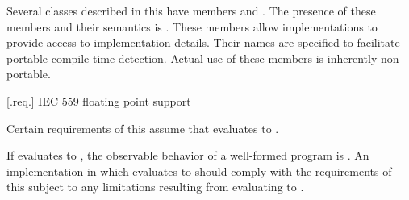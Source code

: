 \pnum
Several classes described in this \documenttypename{} have members 
 and . The presence of these 
members and their semantics is .
\enternote
These members allow implementations to provide access to implementation 
details. Their names are specified to facilitate portable compile-time 
detection. Actual use of these members is inherently non-portable.
\exitnote

 [\iotwod.req.\iecfivefivenine] {IEC 559 floating point support}

\pnum
Certain requirements of this \documenttypename{} assume that 
 evaluates to .

\pnum
If  evaluates to , the 
observable behavior of a well-formed program is \unspecnorm.
\enternote
An implementation in which  evaluates 
to  should comply with the requirements of this \documenttypename 
subject to any limitations resulting from 
 evaluating to .
\exitnote

%
